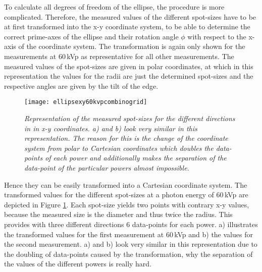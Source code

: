 To  calculate all degrees of freedom of the ellipse, the procedure is more complicated. Therefore, the measured values of the different spot-sizes have to be at first transformed into the x-y coordinate system, to be able to determine the correct prime-axes of the ellipse and their rotation angle $\phi$ with respect to the x-axis of the coordinate system. The transformation is again only shown for the measurements at $60\,$kVp as representative for all other measurements. The measured values of the spot-sizes are given in polar coordinates, at which in this representation the values for the radii are just the determined spot-sizes and the respective angles are given by the tilt of the edge.
\begin{figure}[h]
	\begin{center}
		\texttt{[image: ellipsexy60kvpcombinogrid]}
	\end{center}
	\caption[Transformed spot-size into x-y coordinates]{\textit{Representation of the measured spot-sizes for the different directions in in x-y coordinates. a) and b) look very similar in this representation. The reason for this is the change of the coordinate system from polar to Cartesian coordinates which doubles the data-points of each power and additionally makes the separation of the data-point of the particular powers almost impossible.}}
	\label{xycoordsnogrid}
\end{figure}
\clearpage 
Hence they can be easily transformed into a Cartesian coordinate system. The transformed values for the different spot-sizes at a photon energy of $60\,$kVp are depicted in Figure \ref{xycoordsnogrid}. Each spot-size yields two points with contrary x-y values, because the measured size is the diameter and thus twice the radius. This provides with three different directions 6 data-points for each power. a) illustrates the transformed values for the first measurement at $60\,$kVp and b) the values for the second measurement. a) and b) look very similar in this representation due to the doubling of data-points caused by the transformation, why the separation of the values of the different powers is really hard.\\

